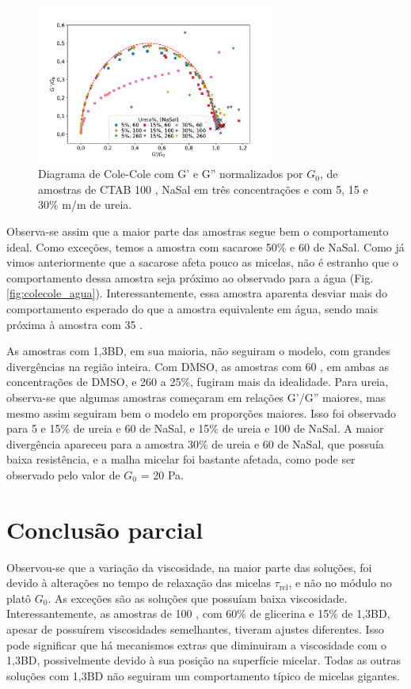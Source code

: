 		\begin{figure}[h]
			\centering
			\includegraphics[width=0.7\textwidth]{imagens/reologia/colecole_ureia}
			\caption{Diagrama de Cole-Cole com G' e G'' normalizados por \(G_0\), de amostras de CTAB 100 \mM{}, NaSal em três concentrações e com 5, 15 e 30\% m/m de ureia.}
			\label{fig:colecole_ureia}
		\end{figure}

		Observa-se assim que a maior parte das amostras segue bem o comportamento ideal. Como exceções, temos a amostra com sacarose 50\% e 60 \mM{} de NaSal. Como já vimos anteriormente que a sacarose afeta pouco as micelas, não é estranho que o comportamento dessa amostra seja próximo ao observado para a água (Fig. \ref{fig:colecole_agua}). Interessantemente, essa amostra aparenta desviar mais do comportamento esperado do que a amostra equivalente em água, sendo mais próxima à amostra com 35 \mM.
		
		As amostras com 1,3BD, em sua maioria, não seguiram o modelo, com grandes divergências na região inteira. Com DMSO, as amostras com 60 \mM, em ambas as concentrações de DMSO, e 260 \mM{} a 25\%, fugiram mais da idealidade. Para ureia, observa-se que algumas amostras começaram em relações G'/G'' maiores, mas mesmo assim seguiram bem o modelo em proporções maiores. Isso foi observado para 5 e 15\% de ureia e 60\mM{} de NaSal, e 15\% de ureia e 100 \mM{} de NaSal. A maior divergência apareceu para a amostra 30\% de ureia e 60 \mM{} de NaSal, que possuía baixa resistência, e a malha micelar foi bastante afetada, como pode ser observado pelo valor de \(G_0\) = 20 Pa.
		
		\section{Conclusão parcial}
		
		Observou-se que a variação da viscosidade, na maior parte das soluções, foi devido à alterações no tempo de relaxação das micelas \(\tau_{\textrm{rel}}\), e não no módulo no platô \(G_0\). As exceções são as soluções que possuíam baixa viscosidade. Interessantemente, as amostras de 100 \mM{}, com 60\% de glicerina e 15\% de 1,3BD, apesar de possuírem viscosidades semelhantes, tiveram ajustes diferentes. Isso pode significar que há mecanismos extras que diminuiram a viscosidade com o 1,3BD, possivelmente devido à sua posição na superfície micelar. Todas as outras soluções com 1,3BD não seguiram um comportamento típico de micelas gigantes.
		
